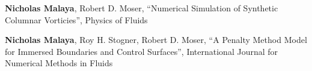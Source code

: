 \textbf{Nicholas Malaya}, Robert D. Moser, ``Numerical Simulation
of Synthetic Columnar Vorticies'', Physics of Fluids

\blankline

\textbf{Nicholas Malaya}, Roy H. Stogner, Robert D. Moser, ``A Penalty
Method Model for Immersed Boundaries and Control Surfaces'', 
International Journal for Numerical Methods in Fluids
